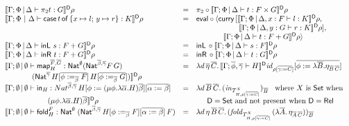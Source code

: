 \documentclass[runningheads]{llncs}
\newcommand{\set}{\mathsf{Set}}
\renewcommand{\id}{\mathit{id}}
\newcommand{\map}{\mathsf{map}}
\newcommand{\fold}{\mathsf{fold}}
\renewcommand{\id}{\mathit{id}}
\newcommand{\inl}{\mathsf{inL}\,}
\newcommand{\inr}{\mathsf{inR}\,}
\begin{document}
\begin{figure}[t]
\begin{adjustbox}{varwidth=6in, max width=5.3in, fbox, center}
\[\begin{array}{lll}
\dsem{\Gamma;\Phi \,|\, \Delta \vdash \pi_2 t : G}\rho & = &
\pi_2 \circ \dsem{\Gamma;\Phi \,|\, \Delta \vdash t : F \times
  G} \rho\\
\dsem{\Gamma;\Phi~|~\Delta \vdash \cse{t}{x \mapsto l}{y \mapsto r} :
  K}\rho & = & \eval \circ \langle \curry \,[\dsem{\Gamma;\Phi
    \,|\, \Delta, x : F \vdash l : K}\rho,\\
   & & \hspace*{0.79in} \dsem{\Gamma;\Phi \,|\, \Delta, y
    : G \vdash r : K}\rho],\\
   & &  \hspace*{0.5in} \dsem{\Gamma;\Phi \,|\, \Delta \vdash t :
  F + G} \rho\rangle\\   
\dsem{\Gamma;\Phi \,|\, \Delta \vdash \inl \,s: F + G} \rho& = &
\inl \circ \dsem{\Gamma;\Phi \,|\, \Delta \vdash s: F}\rho\\
\dsem{\Gamma;\Phi \,|\, \Delta \vdash \inr \,t: F + G}\rho & = & 
\inr \circ \dsem{\Gamma;\Phi \,|\, \Delta \vdash t : G}\rho\\
\llbracket \Gamma;\emptyset \,|\, \emptyset \vdash \map^{\ol{F},\ol{G}}_H
  : \Nat^\emptyset (\Nat^{\ol\beta,\ol\gamma} F\,G)
& = & \lambda d\, \ol\eta\,\ol{C}.\,
\dsem{\Gamma; \ol{\phi},\ol{\gamma}\vdash H}\id_{\rho[\ol{\gamma:=
      C}]}[\ol{\phi := \lambda \ol B. \eta_{\ol B\, \ol C}}]\\ 
\hspace*{0.5in}
  (\Nat^{\ol{\gamma}}\,H[\ol{\phi :=_{\ol{\beta}} F}]\,H[\ol{\phi
      :=_{\ol{\beta}} G}]) \rrbracket^{\mathsf D} \rho & &\\
\llbracket \Gamma;\emptyset \,|\, \emptyset \vdash \tin_H :
Nat^{\ol{\beta},\ol{\gamma}} \, H[\phi := (\mu \phi.\lambda {\overline
    \alpha}.H){\overline \beta}][\ol{\alpha := \beta}] & = &
\lambda d\,\ol{B}\,
\ol{C}.\,(\mathit{in}_{{T}^X_{H,\rho[\ol{\gamma :=
        C}]}})_{\ol{B}} \;\;\mbox{ where } X \mbox{ is } \set \mbox{ when } \\ 
\hspace*{0.79in}(\mu \phi.\lambda {\overline \alpha}.H){\overline
  \beta} \rrbracket^{\mathsf{D}} \rho & & \hspace*{0.2in}  
\mathsf{D} = \set \mbox{ and not present when }
\mathsf{D} = \rel\\  
\llbracket \Gamma;\emptyset \,|\, \emptyset \vdash
  \fold^F_H : \Nat^\emptyset\;(\Nat^{\ol{\beta}, \ol{\gamma}}\,H[\phi
    :=_{\ol{\beta}} F][\ol{\alpha := \beta}]\,F) & = &  
\lambda d\,\eta\,\ol{B}\,\ol{C}.\,
(\mathit{fold}_{T^X_{H,\rho[\ol{\gamma := C}]}} \, (\lambda
\ol{A}.\,\eta_{\ol{A}\,\ol{C}}))_{\ol{B}}\\ 

\end{array}\]
\end{adjustbox}
\end{figure}
\end{document}
